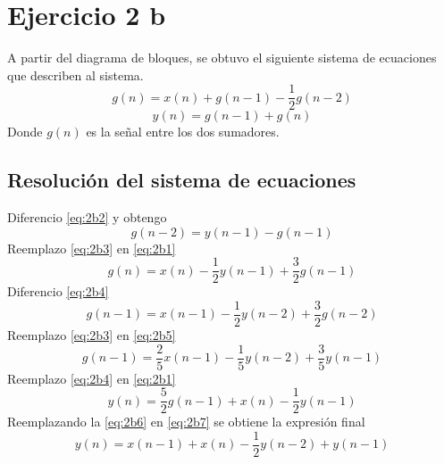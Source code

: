 \documentclass[../../guia1.tex]{subfiles}
\begin{document}
\section*{Ejercicio 2 b}
A partir del diagrama de bloques, se obtuvo el siguiente sistema de ecuaciones que describen al sistema.
\begin{equation}
g(n)=x(n) + g(n-1) - \frac{1}{2} g(n-2) \label{eq:2b1}
\end{equation}
\begin{equation}
y(n)=g(n-1)+g(n) \label{eq:2b2}
\end{equation}
Donde $g(n)$ es la se\~nal entre los dos sumadores.
\subsection*{Resolución del sistema de ecuaciones}
Diferencio \ref{eq:2b2} y obtengo
\begin{equation}
g(n-2)=y(n-1)-g(n-1) \label{eq:2b3}
\end{equation}
Reemplazo \ref{eq:2b3} en \ref{eq:2b1} 
\begin{equation}
g(n)=x(n)-\frac{1}{2}y(n-1) +\frac{3}{2} g(n-1) \label{eq:2b4}
\end{equation}
Diferencio \ref{eq:2b4}
\begin{equation}
g(n-1)=x(n-1)-\frac{1}{2}y(n-2)+\frac{3}{2}g(n-2) \label{eq:2b5}
\end{equation}
Reemplazo \ref{eq:2b3} en \ref{eq:2b5}
\begin{equation}
g(n-1)=\frac{2}{5} x(n-1) -\frac{1}{5}y(n-2) + \frac{3}{5} y(n-1) \label{eq:2b6}
\end{equation}
Reemplazo \ref{eq:2b4} en \ref{eq:2b1}
\begin{equation}
y(n)=\frac{5}{2}g(n-1) +x(n) - \frac{1}{2} y(n-1) \label{eq:2b7}
\end{equation}
Reemplazando la \ref{eq:2b6} en \ref{eq:2b7} se obtiene la expresión final
\begin{equation}
y(n)=x(n-1)+x(n)-\frac{1}{2}y(n-2) + y(n-1) \label{eq:2bfin}
\end{equation}
\end{document}
